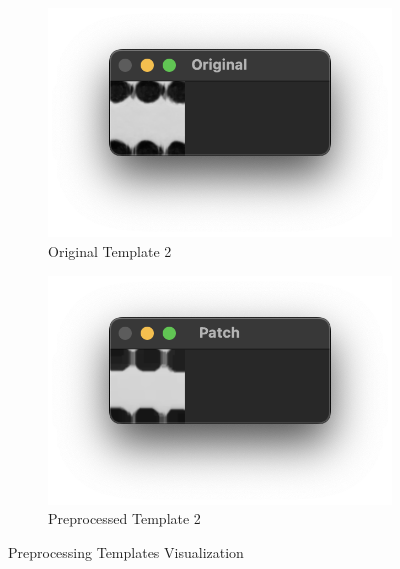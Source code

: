 \documentclass[12pt]{article}
\begin{document}
    \begin{figure}[!h]
        \ContinuedFloat
        \centering
        \begin{subfigure}{.5\textwidth}
            \centering
            \includegraphics[width=0.9\linewidth]{images/templates_no_preprocess/horizontal/6.png}
            \caption{Original Template 2}
            \label{fig:ot-2}
        \end{subfigure}%
        \begin{subfigure}{.5\textwidth}
            \centering
            \includegraphics[width=0.9\linewidth]
            {images/templates_preprocess/horizontal/6.png}
            \caption{Preprocessed Template 2}
            \label{fig:pt-2}
        \end{subfigure}
        \caption{Preprocessing Templates Visualization}
    \end{figure}
\end{document}
